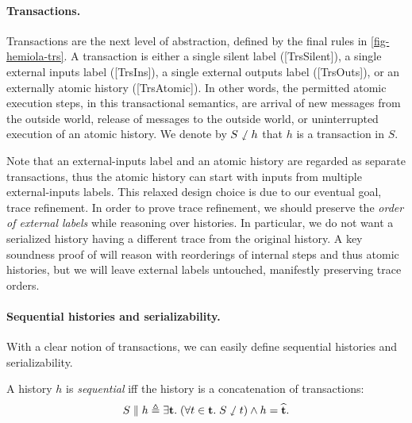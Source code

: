 \paragraph{Transactions.}
Transactions are the next level of abstraction, defined by the final rules in \autoref{fig-hemiola-trs}.
A transaction is either a single silent label ([TrsSilent]), a single external inputs label ([TrsIns]), a single external outputs label ([TrsOuts]), or an externally atomic history ([TrsAtomic]).
In other words, the permitted atomic execution steps, in this transactional semantics, are arrival of new messages from the outside world, release of messages to the outside world, or uninterrupted execution of an atomic history.
We denote by $S \sswarrow h$ that $h$ is a transaction in $S$.

Note that an external-inputs label and an atomic history are regarded as separate transactions, thus the atomic history can start with inputs from multiple external-inputs labels.
This relaxed design choice is due to our eventual goal, trace refinement.
In order to prove trace refinement, we should preserve the \emph{order of external labels} while reasoning over histories.
In particular, we do not want a serialized history having a different trace from the original history.
A key soundness proof of \hemiola{} will reason with reorderings of internal steps and thus atomic histories, but we will leave external labels untouched, manifestly preserving trace orders.

\paragraph{Sequential histories and serializability.}
With a clear notion of transactions, we can easily define sequential histories and serializability.

\begin{definition}
  A history $h$ is \emph{sequential} iff the history is a concatenation of
  transactions:
  \begin{displaymath}
    S \parallel h \triangleq \exists \mathbf{t}.\; (\forall t \in \mathbf{t}.\; S \sswarrow t) \wedge h = \widehat{\mathbf{t}}.
  \end{displaymath}
  \label{def-seq}
\end{definition}

